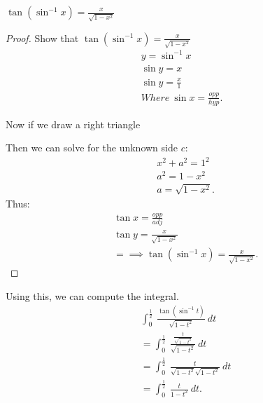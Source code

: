 \documentclass{report}
\begin{document}
    \begin{prop}
       $\tan{(\sin^{-1}{x})} = \frac{x}{\sqrt{1-x^{2}}}$ 
    \end{prop}
    \bigbreak \noindent 
    \begin{proof}
       Show that $\tan{(\sin^{-1}{x})} = \frac{x}{\sqrt{1-x^{2}}}$ 
       \begin{align*}
           y = \sin^{-1}{x} \\
           \sin{y} = x \\
           \sin{y} = \frac{x}{1} \\
           Where\ \sin{x} = \frac{opp}{hyp}
       .\end{align*}
       \bigbreak \noindent 

       Now if we draw a right triangle
       \bigbreak \noindent 
       \begin{minipage}{0.47\textwidth}
       \end{minipage}
       \begin{minipage}{0.47\textwidth}
        Then we can solve for the unknown side $c$:
        \begin{align*}
            &x^{2} + a^{2} = 1^{2} \\
            &a^{2} = 1-x^{2} \\
            &a = \sqrt{1-x^{2}}
        .\end{align*}
        \bigbreak \noindent 
        Thus:
        \begin{align*}
            &\tan{x} = \frac{opp}{adj} \\
            &\tan{y} = \frac{x}{\sqrt{1-x^{2}}} \\
            &=\implies \tan{(\sin^{-1}{x})} = \frac{x}{\sqrt{1-x^{2}}}
        .\end{align*}
       \end{minipage}
       \bigbreak \noindent 
       \end{proof}
       Using this, we can compute the integral.
       \bigbreak \noindent 
      \begin{align*}
           &\int_{0}^{\frac{1}{2}}\ \frac{\tan{(\sin^{-1}{t})}}{\sqrt{1-t^{2}}}\ dt \\
           &=\int_{0}^{\frac{1}{2}}\ \frac{\frac{t}{\sqrt{1-t^{2}}}}{\sqrt{1-t^{2}}}\ dt \\
           &=\int_{0}^{\frac{1}{2}}\ \frac{t}{\sqrt{1-t^{2}}\sqrt{1-t^{2}}}\ dt \\
           &=\int_{0}^{\frac{1}{2}}\ \frac{t}{1-t^{2}}\ dt 
       .\end{align*}
\end{document}
